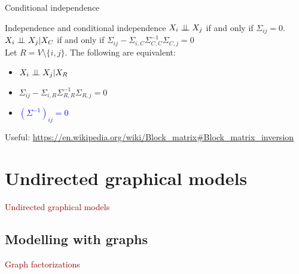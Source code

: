 \documentclass[11pt,handout,aspectratio=169,dvipsnames]{beamer}
\begin{document}
\begin{frame}{Conditional independence}
\begin{alertblock}{Independence and conditional independence}
$X_i\perp\!\!\! \perp X_j$ if and only if $\Sigma_{ij}=0$.\\[.3cm]
$X_i\perp\!\!\! \perp X_j|X_{C}$\;\; if and only if \;\; $\Sigma_{ij}-\Sigma_{i,C}\Sigma_{C,C}^{-1}\Sigma_{C,j}=0$\\[.3cm]
Let $R=V\setminus \{i,j\}$. The following are equivalent:
\begin{itemize}
	\item $X_i\perp\!\!\! \perp X_j|X_{R}$
	\item $\Sigma_{ij}-\Sigma_{i,R}\Sigma_{R,R}^{-1}\Sigma_{R,j}=0$
	\item \textcolor{blue}{$(\Sigma^{-1})_{ij}=0$}
\end{itemize}
\end{alertblock}
{\tiny Useful: \url{https://en.wikipedia.org/wiki/Block_matrix\#Block_matrix_inversion}}
\end{frame}


\section{Undirected graphical models}

\begin{frame}{}
\begin{center}
	{\Huge \textcolor{DarkRed}{Undirected graphical models}}
\end{center}
\end{frame}


\subsection{Modelling with graphs}
\begin{frame}{}
\begin{center}
	{\huge \textcolor{DarkRed}{Graph factorizations}}
\end{center}
\end{frame}
\end{document}
